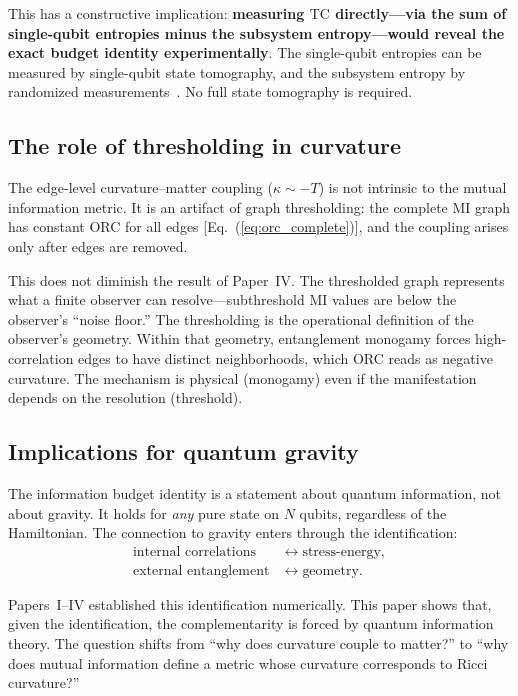 \documentclass[aps,pra,twocolumn,superscriptaddress,floatfix]{revtex4-2}
\begin{document}
This has a constructive implication: \textbf{measuring
$\mathrm{TC}$ directly---via the sum of single-qubit
entropies minus the subsystem entropy---would reveal
the exact budget identity experimentally}.
The single-qubit entropies can be measured by
single-qubit state tomography, and the subsystem
entropy by randomized measurements~\cite{elben2023}.
No full state tomography is required.

\subsection{The role of thresholding in curvature}

The edge-level curvature--matter coupling ($\kappa \sim -T$)
is not intrinsic to the mutual information metric.
It is an artifact of graph thresholding: the complete
MI graph has constant ORC for all edges
[Eq.~(\ref{eq:orc_complete})], and
the coupling arises only after edges are removed.

This does not diminish the result of Paper~IV.  The
thresholded graph represents what a finite observer
can resolve---subthreshold MI values are below the
observer's ``noise floor.''  The thresholding is the
operational definition of the observer's geometry.
Within that geometry, entanglement monogamy forces
high-correlation edges to have distinct neighborhoods,
which ORC reads as negative curvature.  The mechanism
is physical (monogamy) even if the manifestation
depends on the resolution (threshold).

\subsection{Implications for quantum gravity}

The information budget identity is a statement about
quantum information, not about gravity.  It holds for
\textit{any} pure state on $N$ qubits, regardless
of the Hamiltonian.  The connection to gravity enters
through the identification:
\begin{align}
\text{internal correlations} &\leftrightarrow \text{stress-energy}, \\
\text{external entanglement} &\leftrightarrow \text{geometry}.
\end{align}

Papers~I--IV established this identification numerically.
This paper shows that, given the identification, the
complementarity is forced by quantum information theory.
The question shifts from ``why does curvature couple to
matter?'' to ``why does mutual information define
a metric whose curvature corresponds to Ricci curvature?''
\end{document}
